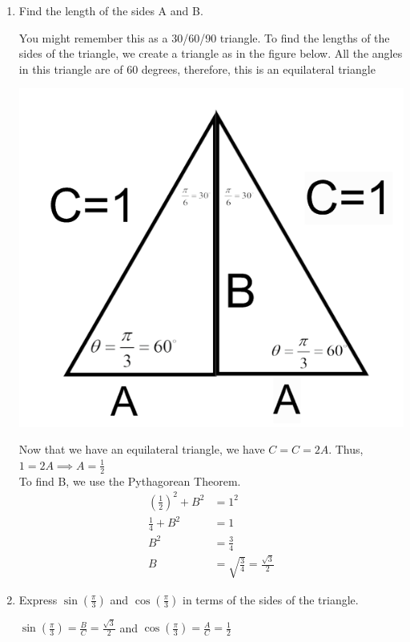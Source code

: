\documentclass[nooutcomes,handout]{ximera}
\begin{document}
\begin{problem}
\begin{enumerate}
		\begin{enumerate}
	\item Find the length of the sides A and B.
	\begin{freeResponse}
	You might remember this as a 30/60/90 triangle.  To find the lengths of the sides of the triangle, we create a triangle as in the figure below.  All the angles in this triangle are of 60 degrees, therefore, this is an equilateral triangle 
		\begin{image}
		\includegraphics[scale=.5]{figure4.png}
		\end{image}
	Now that we have an equilateral triangle, we have $C=C=2A$.  Thus, $1=2A \implies A=\frac{1}{2}$ \\
	To find B, we use the Pythagorean Theorem.
	\begin{align*}
	\left(\frac{1}{2}\right)^2+B^2&=1^2\\
	\frac{1}{4}+B^2&=1 \\ 	
	B^2&=\frac{3}{4}\\
	B&=\sqrt{\frac{3}{4}}=\frac{\sqrt{3}}{2}
	\end{align*}
	\end{freeResponse}

	\item Express $\sin\left(\frac{\pi}{3}\right)$ and $\cos\left(\frac{\pi}{3}\right)$ in terms of the sides of the triangle.

	\begin{freeResponse}
	$\sin\left(\frac{\pi}{3}\right)=\frac{B}{C}=\frac{\sqrt{3}}{2}$ and $\cos\left(\frac{\pi}{3}\right)=\frac{A}{C}=\frac{1}{2}$


\end{freeResponse}
\end{enumerate}
\end{enumerate}
\end{problem}
\end{document}

